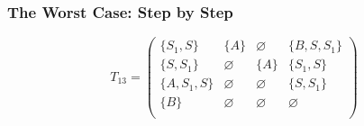 \documentclass[xcolor=table]{beamer}
\begin{document}
\begin{frame}[noframenumbering]

  \frametitle{The Worst Case: Step by Step}

\begin{figure}[h]
\[
T_{13} = \begin{pmatrix}
\{S_1, S\}     & \{A\}       & \varnothing & \{B, S, S_1\}    \\
\{S, S_1\}       & \varnothing & \{A\}       & \{S_1, S\}     \\
\{A, S_1, S\}  & \varnothing & \varnothing & \{S, S_1\} \\
\{B\}       & \varnothing & \varnothing & \varnothing \\
\end{pmatrix}
\]
\label{ExampleQueryFirstIteration}
\end{figure}
\end{frame}
\end{document}
